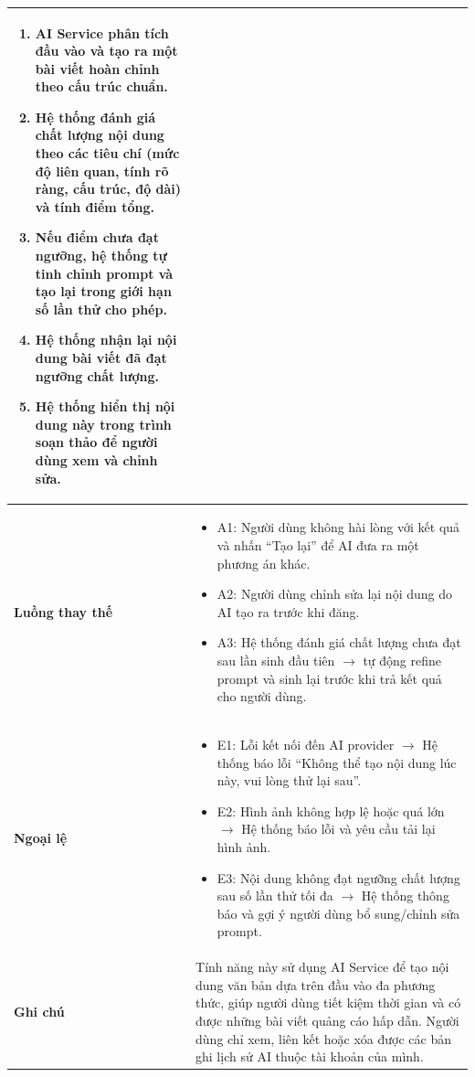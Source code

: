 \begin{longtable}{|p{3.5cm}|p{11cm}|}
\begin{enumerate}
    \item AI Service phân tích đầu vào và tạo ra một bài viết hoàn chỉnh theo cấu trúc chuẩn.
    \item Hệ thống đánh giá chất lượng nội dung theo các tiêu chí (mức độ liên quan, tính rõ ràng, cấu trúc, độ dài) và tính điểm tổng.
    \item Nếu điểm chưa đạt ngưỡng, hệ thống tự tinh chỉnh prompt và tạo lại trong giới hạn số lần thử cho phép.
    \item Hệ thống nhận lại nội dung bài viết đã đạt ngưỡng chất lượng.
    \item Hệ thống hiển thị nội dung này trong trình soạn thảo để người dùng xem và chỉnh sửa.
\end{enumerate} \\ \hline
\textbf{Luồng thay thế} & 
\begin{itemize}
    \item A1: Người dùng không hài lòng với kết quả và nhấn ``Tạo lại'' để AI đưa ra một phương án khác.
    \item A2: Người dùng chỉnh sửa lại nội dung do AI tạo ra trước khi đăng.
    \item A3: Hệ thống đánh giá chất lượng chưa đạt sau lần sinh đầu tiên $\rightarrow$ tự động refine prompt và sinh lại trước khi trả kết quả cho người dùng.
\end{itemize} \\ \hline
\textbf{Ngoại lệ} & 
\begin{itemize}
    \item E1: Lỗi kết nối đến AI provider $\rightarrow$ Hệ thống báo lỗi ``Không thể tạo nội dung lúc này, vui lòng thử lại sau''.
    \item E2: Hình ảnh không hợp lệ hoặc quá lớn $\rightarrow$ Hệ thống báo lỗi và yêu cầu tải lại hình ảnh.
    \item E3: Nội dung không đạt ngưỡng chất lượng sau số lần thử tối đa $\rightarrow$ Hệ thống thông báo và gợi ý người dùng bổ sung/chỉnh sửa prompt.
\end{itemize} \\ \hline
\textbf{Ghi chú} & Tính năng này sử dụng AI Service để tạo nội dung văn bản dựa trên đầu vào đa phương thức, giúp người dùng tiết kiệm thời gian và có được những bài viết quảng cáo hấp dẫn. Người dùng chỉ xem, liên kết hoặc xóa được các bản ghi lịch sử AI thuộc tài khoản của mình. \\ \hline
\end{longtable}
\endgroup

